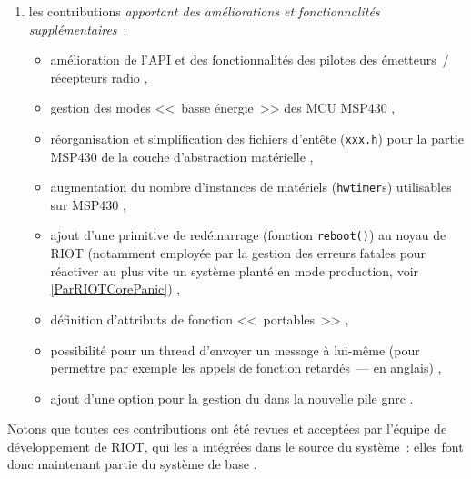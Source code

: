 \begin{enumerate}
\item les contributions \emph{apportant des améliorations et fonctionnalités
supplémentaires}~:
\begin{itemize}
\item amélioration de l'API et des fonctionnalités des pilotes des
émetteurs~/ récepteurs radio \cite{PRriotEnh12} \cite{PRriotEnh10}
\cite{PRriotEnh11} \cite{PRriotEnh7} \cite{PRriotEnh6},
\item gestion des modes <<~basse énergie~>> des MCU MSP430
\cite{PRriotEnh2},
\item réorganisation et simplification des fichiers d'entête
(\texttt{xxx.h}) pour la partie MSP430 de la couche d'abstraction
matérielle \cite{PRriotEnh1},
\item augmentation du nombre d'instances de  matériels
(\texttt{hwtimer}s) utilisables sur MSP430 \cite{PRriotEnh9},
\item ajout d'une primitive de redémarrage (fonction \texttt{reboot()})
au noyau de RIOT (notamment employée par la gestion des erreurs fatales
pour réactiver au plus vite un système planté en mode production, voir
\vref{ParRIOTCorePanic}) \cite{PRriotEnh5} \cite{PRriotEnh3},
\item définition d'attributs de fonction <<~portables~>> \cite{PRriotEnh4},
\item possibilité pour un thread d'envoyer un message à lui-même
(pour permettre par exemple les appels de fonction retardés~---
 en anglais) \cite{PRriotEnh8},
\item ajout d'une option pour la gestion du 
dans la nouvelle pile gnrc \cite{PRriotEnh13}.
\end{itemize}

\end{enumerate}

\medskip

Notons que toutes ces contributions ont été revues et acceptées par
l'équipe de développement de RIOT, qui les a intégrées dans le source
 du système~: elles font donc maintenant partie du
système de base \footnotemark[3].


